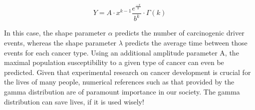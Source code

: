 \documentclass[12pt]{article}
\begin{document}
\begin{equation}
	Y = A\cdot x^{k-1}\frac{e^{\frac{-x}{b}}}{b^k}\cdot\Gamma(k)
\end{equation}

In this case, the shape parameter $\alpha$ predicts the number of carcinogenic driver events, whereas the shape
parameter $\lambda$ predicts the average time between those events for each cancer type. Using an additional amplitude
parameter A, the maximal population susceptibility to a given type of cancer can even be
predicted\cite{belikovNumberKeyCarcinogenic2017}. Given that experimental research on cancer development is crucial for
the lives of many people, numerical references such as that provided by the gamma distribution are of paramount
importance in our society. The gamma distribution can save lives, if it is used wisely!


\pagebreak
\end{document}

